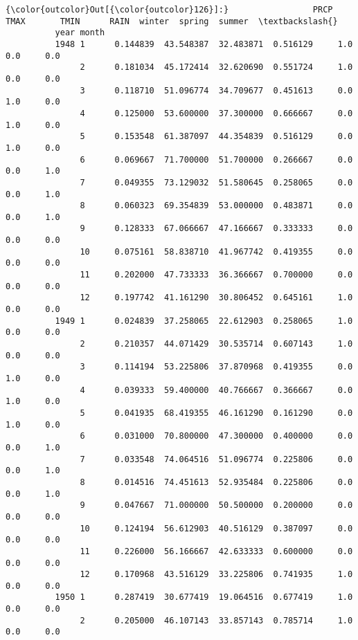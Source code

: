 \documentclass[11pt]{article}
\begin{document}
\begin{Verbatim}[commandchars=\\\{\}]
{\color{outcolor}Out[{\color{outcolor}126}]:}                 PRCP       TMAX       TMIN      RAIN  winter  spring  summer  \textbackslash{}
          year month                                                                     
          1948 1      0.144839  43.548387  32.483871  0.516129     1.0     0.0     0.0   
               2      0.181034  45.172414  32.620690  0.551724     1.0     0.0     0.0   
               3      0.118710  51.096774  34.709677  0.451613     0.0     1.0     0.0   
               4      0.125000  53.600000  37.300000  0.666667     0.0     1.0     0.0   
               5      0.153548  61.387097  44.354839  0.516129     0.0     1.0     0.0   
               6      0.069667  71.700000  51.700000  0.266667     0.0     0.0     1.0   
               7      0.049355  73.129032  51.580645  0.258065     0.0     0.0     1.0   
               8      0.060323  69.354839  53.000000  0.483871     0.0     0.0     1.0   
               9      0.128333  67.066667  47.166667  0.333333     0.0     0.0     0.0   
               10     0.075161  58.838710  41.967742  0.419355     0.0     0.0     0.0   
               11     0.202000  47.733333  36.366667  0.700000     0.0     0.0     0.0   
               12     0.197742  41.161290  30.806452  0.645161     1.0     0.0     0.0   
          1949 1      0.024839  37.258065  22.612903  0.258065     1.0     0.0     0.0   
               2      0.210357  44.071429  30.535714  0.607143     1.0     0.0     0.0   
               3      0.114194  53.225806  37.870968  0.419355     0.0     1.0     0.0   
               4      0.039333  59.400000  40.766667  0.366667     0.0     1.0     0.0   
               5      0.041935  68.419355  46.161290  0.161290     0.0     1.0     0.0   
               6      0.031000  70.800000  47.300000  0.400000     0.0     0.0     1.0   
               7      0.033548  74.064516  51.096774  0.225806     0.0     0.0     1.0   
               8      0.014516  74.451613  52.935484  0.225806     0.0     0.0     1.0   
               9      0.047667  71.000000  50.500000  0.200000     0.0     0.0     0.0   
               10     0.124194  56.612903  40.516129  0.387097     0.0     0.0     0.0   
               11     0.226000  56.166667  42.633333  0.600000     0.0     0.0     0.0   
               12     0.170968  43.516129  33.225806  0.741935     1.0     0.0     0.0   
          1950 1      0.287419  30.677419  19.064516  0.677419     1.0     0.0     0.0   
               2      0.205000  46.107143  33.857143  0.785714     1.0     0.0     0.0   

\end{Verbatim}
\end{document}
